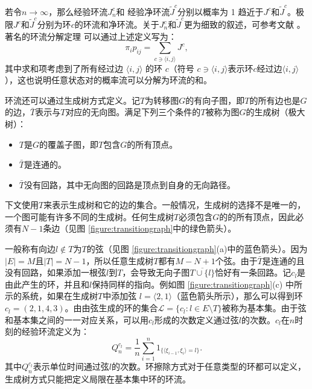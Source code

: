 若令$n \to \infty$，那么经验环流$J^c_n$和 经验净环流$\tilde{J}^c$分别以概率为 1 趋近于$J^c$和$\tilde{J}^c$。极限$J^c$和$\tilde{J}^c$分别为环$c$的环流和净环流。关于$J^c_n$和$\tilde{J}^c$更为细致的叙述，可参考文献 \cite{jiang2004mathematical}。著名的环流分解定理 \cite{jiang2004mathematical} 可以通过上述定义写为：
\begin{equation}\label{decomposition}
    \pi_ip_{ij} = \sum_{c\ni\langle i,j\rangle}J^c,
\end{equation}
其中求和项考虑到了所有经过边 $\langle i, j\rangle$ 的环 $c$（符号 $c \ni \langle i, j\rangle$表示环$c$经过边$\langle i, j\rangle$），这也说明任意状态对的概率流可以分解为环流的和。

环流还可以通过生成树方式定义\cite{Schnakenberg1976NetworkTO,kalpazidou2007cycle}。记$T$为转移图$G$的有向子图，即$T$的所有边也是$G$的边，$\bar{T}$表示与$T$对应的无向图。满足下列三个条件的$T$被称为图$G$的生成树（极大树）：
\begin{itemize}
    \item $T$是$G$的覆盖子图，即$T$包含$G$的所有顶点。
    \item $\bar{T}$是连通的。
    \item $\bar{T}$没有回路，其中无向图的回路是顶点到自身的无向路径。
\end{itemize}

下文使用$T$来表示生成树和它的边的集合。一般情况，生成树的选择不是唯一的，一个图可能有许多不同的生成树。任何生成树$T$必须包含$G$的的所有顶点，因此必须有$N-1$条边（见图 \ref{figure:transitiongraph}中的绿色箭头）\cite{kalpazidou2007cycle}。

一般称有向边$l \notin T$为$T$的弦（见图 \ref{figure:transitiongraph}(a)中的蓝色箭头）。因为$|E|=M$且$|T|= N-1$，所以任意生成树$T$都有$M-N+1$个弦。由于$\bar{T}$是连通的且没有回路，如果添加一根弦$l$到$T$，会导致无向子图$\overline{T \cup \{l\}}$恰好有一条回路。记$c_l$是由此产生的环，并且和$l$保持同样的指向。例如图 \ref{figure:transitiongraph}(c) 中所示的系统，如果在生成树$T$中添加弦 $l=\langle 2,1 \rangle$（蓝色箭头所示），那么可以得到环 $c_l=(2,1,4,3)$。由由弦生成的环的集合$\mathcal{L} = \{c_l: l\in E\setminus T\}$被称为基本集。由于弦和基本集之间的一一对应关系，可以用$c_l$形成的次数定义通过弦$l$的次数。$c_l$在$n$时刻的经验环流定义为：
\begin{equation*}
    Q^{c_l}_n = \frac{1}{n}\sum_{i=1}^n1_{\{\langle\xi_{i-1},\xi_i\rangle=l\}}.
\end{equation*}
其中$Q^{c_l}_n$表示单位时间通过弦$l$的次数。环擦除方式对于任意类型的环都可以定义，生成树方式只能把定义局限在基本集中环的环流。

